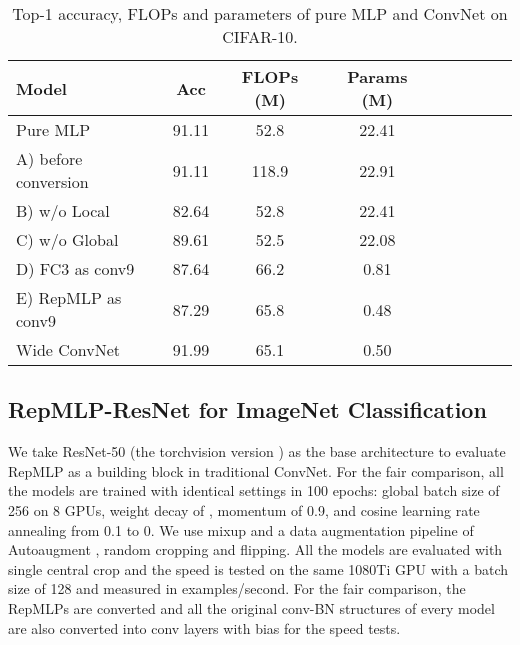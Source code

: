 \documentclass[10pt,twocolumn,letterpaper]{article}
\begin{document}
\setlength{\tabcolsep}{4pt}
\begin{table}
	\caption{Top-1 accuracy, FLOPs and parameters of pure MLP and ConvNet on CIFAR-10. }
	\label{table-puremlp}
	\vspace{-0.2in}
	\begin{center}
		\small
		\begin{tabular}{lcccccccc}
			\hline
			Model					&	Acc		&	 FLOPs (M)	&	Params (M) 	\\
			\hline
			Pure MLP				&	91.11	&	52.8		&	22.41	\\
			A) before conversion	&	91.11	&	118.9		&	22.91	\\	
			B) w/o Local			&	82.64	&	52.8		&	22.41	\\	
			C) w/o Global			&	89.61	&	52.5		&	22.08	\\
			D) FC3 as conv9			&	87.64	&	66.2		&	0.81		\\
			E) RepMLP as conv9		&	87.29	&	65.8		&	0.48		\\
			\hline			
			Wide ConvNet	&	91.99	&	65.1		&	0.50		\\
			\hline
		\end{tabular}
	\end{center}
	\vspace{-0.2in}
\end{table}
\setlength{\tabcolsep}{1.4pt}







\subsection{RepMLP-ResNet for ImageNet Classification}



We take ResNet-50 \cite{he2016deep} (the torchvision version \cite{torch-model}) as the base architecture to evaluate RepMLP as a building block in traditional ConvNet. For the fair comparison, all the models are trained with identical settings in 100 epochs: global batch size of 256 on 8 GPUs, weight decay of , momentum of 0.9, and cosine learning rate annealing from 0.1 to 0. We use mixup \cite{zhang2017mixup} and a data augmentation pipeline of Autoaugment \cite{cubuk2019autoaugment}, random cropping and flipping. All the models are evaluated with single central crop and the speed is tested on the same 1080Ti GPU with a batch size of 128 and measured in examples/second. For the fair comparison, the RepMLPs are converted and all the original conv-BN structures of every model are also converted into conv layers with bias for the speed tests. 
\end{document}
